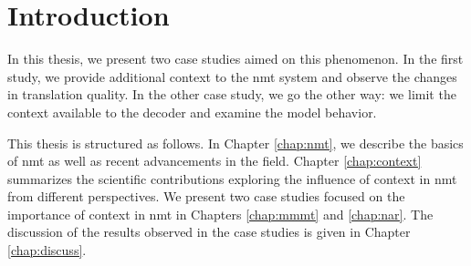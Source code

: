 \chapter{Introduction}
\label{chap:intro}


In this thesis, we present two case studies aimed on this phenomenon. In the
first study, we provide additional context to the \gls{nmt} system and observe
the changes in translation quality. In the other case study, we go the other
way: we limit the context available to the decoder and examine the model
behavior.


This thesis is structured as follows. In Chapter \ref{chap:nmt}, we describe
the basics of \gls{nmt} as well as recent advancements in the field. Chapter
\ref{chap:context} summarizes the scientific contributions exploring the
influence of context in \gls{nmt} from different perspectives. We present two
case studies focused on the importance of context in \gls{nmt} in Chapters
\ref{chap:mmmt} and \ref{chap:nar}. The discussion of the results observed in
the case studies is given in Chapter \ref{chap:discuss}.
